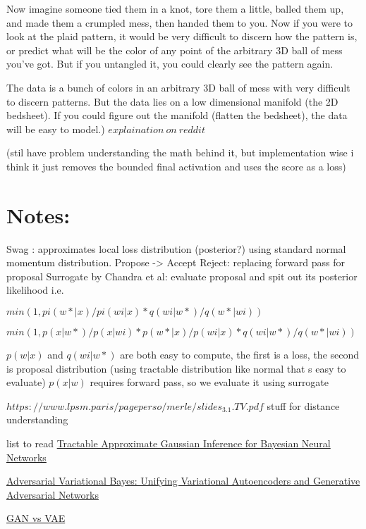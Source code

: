 \documentclass[honours,12pt]{unswthesis}
\numberwithin{equation}{section}
\begin{document}
Now imagine someone tied them in a knot, tore them a little, balled them up, and made them a crumpled mess, then handed them to you. Now if you were to look at the plaid pattern, it would be very difficult to discern how the pattern is, or predict what will be the color of any point of the arbitrary 3D ball of mess you've got. But if you untangled it, you could clearly see the pattern again.

The data is a bunch of colors in an arbitrary 3D ball of mess with very difficult to discern patterns. But the data lies on a low dimensional manifold (the 2D bedsheet). If you could figure out the manifold (flatten the bedsheet), the data will be easy to model.)  $explaination\ on\ reddit$

(stil have problem understanding the math behind it, but implementation wise i think it just removes the bounded final activation and uses the score as a loss) 


\section{ Notes:}

Swag : approximates local loss distribution (posterior?) using standard normal momentum distribution.
Propose -> Accept Reject: replacing forward pass for proposal 
Surrogate by Chandra et al: evaluate proposal and spit out its posterior likelihood
    i.e. 
    
    $min(1, pi(w*|x)/pi(wi|x) *  q(wi|w*)/q(w*|wi) )$
    
    $min(1, p(x|w*)/p(x|wi) * p(w*|x)/p(wi|x) *  q(wi|w*)/q(w*|wi) )$

    $p(w|x)$ and $q(wi|w*)$ are both easy to compute, the first is a loss, the second is proposal distribution (using tractable distribution like normal that s easy to evaluate)    
    $p(x|w)$ requires forward pass, so we evaluate it using surrogate


\noindent $https://www.lpsm.paris/pageperso/merle/slides_3.1.TV.pdf$ stuff for distance understanding

list to read
\href{https://jmlr.org/papers/volume22/20-1009/20-1009.pdf}{Tractable Approximate Gaussian Inference for
Bayesian Neural Networks
}

\href{https://arxiv.org/pdf/1701.04722.pdf}{Adversarial Variational Bayes:
Unifying Variational Autoencoders and Generative Adversarial Networks}

\href{https://towardsdatascience.com/gans-vs-autoencoders-comparison-of-deep-generative-models-985cf15936ea}{GAN vs VAE}
\end{document}
